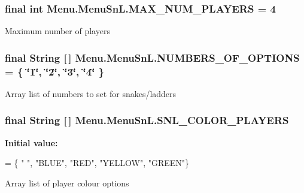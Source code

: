 \subsubsection[{M\+A\+X\+\_\+\+N\+U\+M\+\_\+\+P\+L\+A\+Y\+E\+R\+S}]{\setlength{\rightskip}{0pt plus 5cm}final int Menu.\+Menu\+Sn\+L.\+M\+A\+X\+\_\+\+N\+U\+M\+\_\+\+P\+L\+A\+Y\+E\+R\+S = 4\hspace{0.3cm}{\ttfamily [private]}}\label{class_menu_1_1_menu_sn_l_afc7fd19db34602b6b5a85df60c736103}
Maximum number of players \hypertarget{class_menu_1_1_menu_sn_l_aa0ead71ad043fc5f187fde721b34c34b}{}
\subsubsection[{N\+U\+M\+B\+E\+R\+S\+\_\+\+O\+F\+\_\+\+O\+P\+T\+I\+O\+N\+S}]{\setlength{\rightskip}{0pt plus 5cm}final String \mbox{[}$\,$\mbox{]} Menu.\+Menu\+Sn\+L.\+N\+U\+M\+B\+E\+R\+S\+\_\+\+O\+F\+\_\+\+O\+P\+T\+I\+O\+N\+S = \{ \char`\"{}1\char`\"{}, \char`\"{}2\char`\"{}, \char`\"{}3\char`\"{}, \char`\"{}4\char`\"{} \}\hspace{0.3cm}{\ttfamily [private]}}\label{class_menu_1_1_menu_sn_l_aa0ead71ad043fc5f187fde721b34c34b}
Array list of numbers to set for snakes/ladders \hypertarget{class_menu_1_1_menu_sn_l_aa0aa3bcb48114b48faa0a49fa0c98504}{}
\subsubsection[{S\+N\+L\+\_\+\+C\+O\+L\+O\+R\+\_\+\+P\+L\+A\+Y\+E\+R\+S}]{\setlength{\rightskip}{0pt plus 5cm}final String \mbox{[}$\,$\mbox{]} Menu.\+Menu\+Sn\+L.\+S\+N\+L\+\_\+\+C\+O\+L\+O\+R\+\_\+\+P\+L\+A\+Y\+E\+R\+S\hspace{0.3cm}{\ttfamily [private]}}\label{class_menu_1_1_menu_sn_l_aa0aa3bcb48114b48faa0a49fa0c98504}
{\bfseries Initial value\+:}
\begin{DoxyCode}
= \{ \textcolor{stringliteral}{" "}, \textcolor{stringliteral}{"BLUE"}, \textcolor{stringliteral}{"RED"},
            \textcolor{stringliteral}{"YELLOW"}, \textcolor{stringliteral}{"GREEN"}\}
\end{DoxyCode}
Array list of player colour options \hypertarget{class_menu_1_1_menu_sn_l_accdb88464884a651bab3a9ebb5eb2beb}{}
